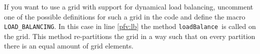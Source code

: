 \documentclass[11pt,a4paper,headinclude,footinclude,DIV16,headings=normal]{scrreprt}
\newtheorem{lst}{Listing}
\begin{document}
If you want to use a grid with support for dynamical load balancing, uncomment
one of the possible definitions for such a grid in the code and define the
macro \lstinline!LOAD_BALANCING!. In this case in line \ref{pfv:lb} the method
\lstinline!loadBalance!\ is called on the grid.
This method re-partitions the grid in a way such that on every partition there
is an equal amount of grid elements.













% 
\end{document}
